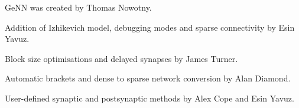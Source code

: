 Ge\+N\+N was created by Thomas Nowotny.

Addition of Izhikevich model, debugging modes and sparse connectivity by Esin Yavuz.

Block size optimisations and delayed synapses by James Turner.

Automatic brackets and dense to sparse network conversion by Alan Diamond.

User-\/defined synaptic and postsynaptic methods by Alex Cope and Esin Yavuz. 
